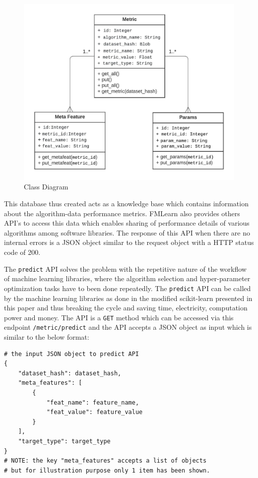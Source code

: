 \begin{figure}[H]
    \centering
    \includegraphics[width=15cm]{images/Class Diagram.jpeg}
    \caption{Class Diagram}
    \label{class-diagram}
\end{figure}

This database thus created acts as a knowledge base which contains information about the algorithm-data performance metrics. FMLearn also provides others API's to access this data which enables sharing of performance details of various algorithms among software libraries. The response of this API when there are no internal errors is a JSON object similar to the request object with a HTTP status code of 200.

The \texttt{predict} API solves the problem with the repetitive nature of the workflow of machine learning libraries, where the algorithm selection and hyper-parameter optimization tasks have to been done repeatedly. The \texttt{predict} API can be called by the machine learning libraries as done in the modified scikit-learn presented in this paper and thus breaking the cycle and saving time, electricity, computation power and money. The API is a \texttt{GET} method which can be accessed via this endpoint \texttt{/metric/predict} and the API accepts a JSON object as input which is similar to the below format:

\begin{lstlisting}
# the input JSON object to predict API
{
	"dataset_hash": dataset_hash,
	"meta_features": [
		{
			"feat_name": feature_name,
			"feat_value": feature_value
		}
	],
	"target_type": target_type
}
# NOTE: the key "meta_features" accepts a list of objects
# but for illustration purpose only 1 item has been shown.
\end{lstlisting}

